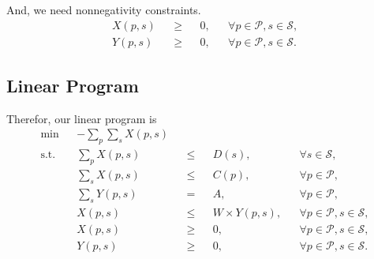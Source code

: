 And, we need nonnegativity constraints. 
\begin{align}
X(p,s) && \geq && 0, && \forall p \in \mathcal{P}, s \in \mathcal{S},\\
Y(p,s) && \geq && 0, && \forall p \in \mathcal{P}, s \in \mathcal{S}.
\end{align}
\subsection{Linear Program}
Therefor, our linear program is
\begin{align*}
\min && -\sum_p \sum_s X(p,s) &&  && &&\\
\text{s.t.} && \sum_p X(p,s) && \leq && D(s) , && \forall s\in \mathcal{S},\\
&& \sum_s X(p,s) && \leq && C(p), && \forall p\in \mathcal{P},\\
&& \sum_s Y(p,s) && = && A, && \forall p\in \mathcal{P},\\
&& X(p,s) && \leq && W \times Y(p,s), && \forall p \in \mathcal{P}, s \in \mathcal{S},\\
&& X(p,s) && \geq && 0, && \forall p \in \mathcal{P}, s \in \mathcal{S},\\
&& Y(p,s) && \geq && 0, && \forall p \in \mathcal{P}, s \in \mathcal{S}.
\end{align*}

